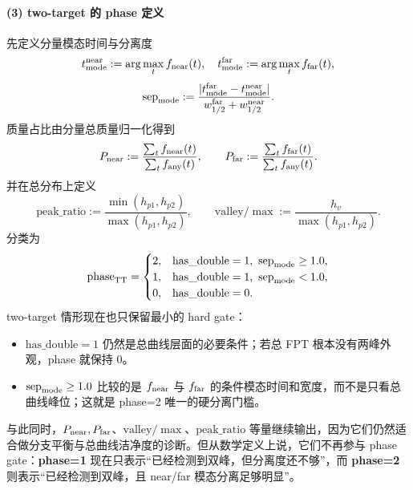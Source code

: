 \documentclass[11pt,fontset=fandol]{ctexart}
\begin{document}
\paragraph{(3) two-target 的 phase 定义}
先定义分量模态时间与分离度
\[
t_{\rm mode}^{\rm near}:=\arg\max_t f_{\rm near}(t),\quad
t_{\rm mode}^{\rm far}:=\arg\max_t f_{\rm far}(t),
\]
\[
\mathrm{sep}_{\rm mode}:=\frac{|t_{\rm mode}^{\rm far}-t_{\rm mode}^{\rm near}|}{w_{1/2}^{\rm far}+w_{1/2}^{\rm near}}.
\]
质量占比由分量总质量归一化得到
\[
P_{\rm near}:=\frac{\sum_t f_{\rm near}(t)}{\sum_t f_{\rm any}(t)},\qquad
P_{\rm far}:=\frac{\sum_t f_{\rm far}(t)}{\sum_t f_{\rm any}(t)}.
\]
并在总分布上定义
\[
\mathrm{peak\_ratio}:=\frac{\min(h_{p1},h_{p2})}{\max(h_{p1},h_{p2})},\qquad
\mathrm{valley}/\max:=\frac{h_v}{\max(h_{p1},h_{p2})}.
\]
分类为
\[
\mathrm{phase}_{\rm TT}=
\begin{cases}
2,& \mathrm{has\_double}=1,\ \mathrm{sep}_{\rm mode}\ge 1.0,\\
1,& \mathrm{has\_double}=1,\ \mathrm{sep}_{\rm mode}< 1.0,\\
0,& \mathrm{has\_double}=0.
\end{cases}
\]
two-target 情形现在也只保留最小的 hard gate：
\begin{itemize}
  \item $\mathrm{has\_double}=1$ 仍然是总曲线层面的必要条件；若总 FPT 根本没有两峰外观，phase 就保持 0。
  \item $\mathrm{sep}_{\rm mode}\ge 1.0$ 比较的是 $f_{\rm near}$ 与 $f_{\rm far}$ 的条件模态时间和宽度，而不是只看总曲线峰位；这就是 phase=2 唯一的硬分离门槛。
\end{itemize}
与此同时，$P_{\rm near},P_{\rm far}$、$\mathrm{valley}/\max$、$\mathrm{peak\_ratio}$ 等量继续输出，因为它们仍然适合做分支平衡与总曲线洁净度的诊断。但从数学定义上说，它们不再参与 phase gate：\textbf{phase=1} 现在只表示“已经检测到双峰，但分离度还不够”，而 \textbf{phase=2} 则表示“已经检测到双峰，且 near/far 模态分离足够明显”。
\end{document}
